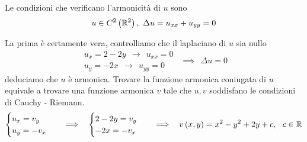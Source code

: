 \Soluzione

\begin{defn}
Le condizioni che verificano l'armonicità di $u$ sono
\begin{equation}
u\in C^{2}\left(\RR^{2}\right), \ \Delta u = u_{xx} + u_{yy} = 0
\end{equation}
\end{defn}
La prima è certamente vera, controlliamo che il laplaciano di $u$ sia nullo
\begin{equation*}
\begin{array}{r}
u_{x} = 2 - 2y\ \ \rightarrow \ \ u_{xx} = 0\\
u_{y} = - 2x\ \ \rightarrow \ \ u_{yy} = 0
\end{array} \ \ \implies \ \ \Delta u = 0
\end{equation*}
deduciamo che $u$ è armonica. Trovare la funzione armonica coniugata di $u$ equivale a trovare una funzione armonica $v$ tale che $u, v$ soddisfano le condizioni di Cauchy - Riemann.
\begin{equation*}
\begin{cases}
u_{x} = v_{y}\\
u_{y} = - v_{x}
\end{cases} \ \ \implies \ \
\begin{cases}
2 - 2y = v_{y}\\
- 2x = -v_{x}
\end{cases} \ \ \implies \ \ v\left(x, y\right) = x^{2} - y^{2} + 2y + c, \ \ c\in \mathbb{R}
\end{equation*}

\Soluzione

